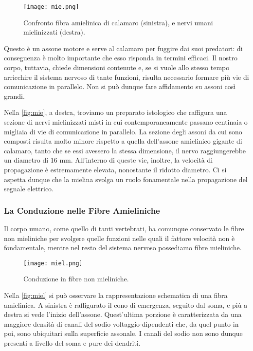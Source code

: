 \begin{figure}[h]
    \centering
    \texttt{[image: mie.png]}
    \caption{Confronto fibra amielinica di calamaro (sinistra), e nervi umani mielinizzati (destra).}
    \label{fig:mie}
\end{figure}


Questo è un assone motore e serve al calamaro per fuggire dai suoi predatori: di conseguenza è molto importante che esso risponda in termini efficaci. Il nostro corpo, tuttavia, chiede dimensioni contenute e, se si vuole allo stesso tempo arricchire il sistema nervoso di tante funzioni, risulta necessario formare più vie di comunicazione in parallelo. Non si può dunque fare affidamento su assoni così grandi.

Nella \autoref{fig:mie}, a destra, troviamo un preparato istologico che raffigura una sezione di nervi mielinizzati misti in cui contemporaneamente passano centinaia o migliaia di vie di comunicazione in parallelo. La sezione degli assoni da cui sono composti risulta molto minore rispetto a quella dell’assone amielinico gigante di calamaro, tanto che se essi avessero la stessa dimensione, il nervo raggiungerebbe un diametro di 16 mm. All’interno di queste vie, inoltre, la velocità di propagazione è estremamente elevata, nonostante il ridotto diametro. Ci si aspetta dunque che la mielina svolga un ruolo fonamentale nella propagazione del segnale elettrico.

\subsubsection{La Conduzione nelle Fibre Amieliniche}
Il corpo umano, come quello di tanti vertebrati, ha comunque conservato le fibre non mieliniche per svolgere quelle funzioni nelle quali il fattore velocità non è fondamentale, mentre nel resto del sistema nervoso possediamo fibre mieliniche.

\begin{figure}[h]
    \centering
    \texttt{[image: miel.png]}
    \caption{Conduzione in fibre non mieliniche.}
    \label{fig:miel}
\end{figure}

Nella \autoref{fig:miel} si può osservare la rappresentazione schematica di una fibra amielinica. A sinistra è raffigurato il cono di emergenza, seguito dal soma, e più a destra si vede l’inizio dell’assone. Quest’ultima porzione è caratterizzata da una maggiore densità di canali del sodio voltaggio-dipendenti che, da quel punto in poi, sono ubiquitari sulla superficie assonale. I canali del sodio non sono dunque presenti a livello del soma e pure dei dendriti.

